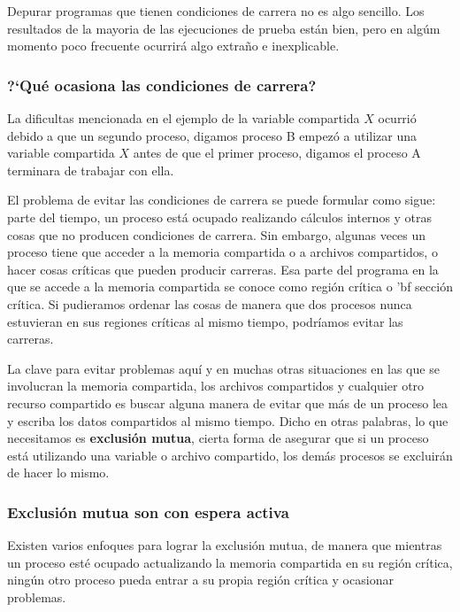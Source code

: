 \documentclass{article}
\begin{document}
Depurar programas que tienen condiciones de carrera no es algo 
sencillo. Los resultados de la mayoria de las ejecuciones de 
prueba est\'an bien, pero en alg\'um momento poco frecuente 
ocurrir\'a algo extra\~no e inexplicable.

\subsubsection*{?`Qu\'e ocasiona las condiciones de carrera?}
La dificultas mencionada en el ejemplo de la variable compartida 
$X$ ocurri\'o debido a que un segundo proceso, digamos proceso B 
empez\'o a utilizar una variable compartida $X$ antes de que el 
primer proceso, digamos el proceso A terminara de trabajar con 
ella.

El problema de evitar las condiciones de carrera se puede 
formular como sigue: parte del tiempo, un proceso est\'a ocupado 
realizando c\'alculos internos y otras cosas que no producen 
condiciones de carrera. Sin embargo, algunas veces un  proceso 
tiene que acceder a la memoria compartida o a archivos compartidos, 
o hacer cosas cr\'iticas que pueden producir carreras. Esa parte 
del programa en la que se accede a la memoria compartida se conoce 
como {regi\'on cr\'itica} o {'bf secci\'on cr\'itica}. Si pudieramos 
ordenar las cosas de manera que dos procesos nunca estuvieran en sus 
regiones cr\'iticas al mismo tiempo, podr\'iamos evitar las carreras.

La clave para evitar problemas aqu\'i y en muchas otras situaciones 
en las que se involucran la memoria compartida, los archivos 
compartidos y cualquier otro recurso compartido es buscar alguna 
manera de evitar que m\'as de un proceso lea y escriba los 
datos compartidos al mismo tiempo. Dicho en otras palabras, lo 
que necesitamos es {\bf exclusi\'on mutua}, cierta forma de asegurar 
que si un proceso est\'a utilizando una variable o archivo compartido, 
los dem\'as procesos se excluir\'an de hacer lo mismo.

\subsubsection{Exclusi\'on mutua son con espera activa}
Existen varios enfoques para lograr la exclusi\'on mutua, de manera 
que mientras un proceso est\'e ocupado actualizando la memoria 
compartida en su regi\'on cr\'itica, ning\'un otro proceso pueda 
entrar a su propia regi\'on cr\'itica y ocasionar problemas.
\end{document}
